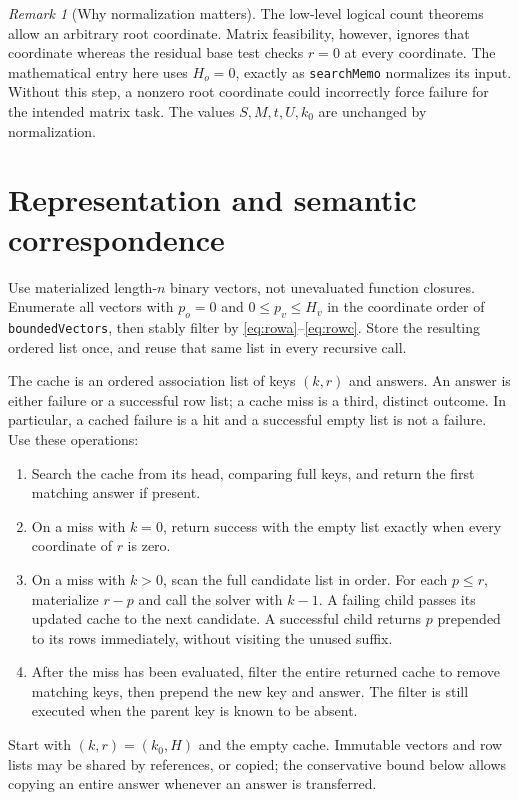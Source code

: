 \documentclass[11pt,a4paper]{article}
\theoremstyle{definition}
\theoremstyle{remark}
\newtheorem{remark}[theorem]{Remark}
\begin{document}
\begin{remark}[Why normalization matters]
The low-level logical count theorems allow an arbitrary root coordinate.
Matrix feasibility, however, ignores that coordinate whereas the residual
base test checks \(r=0\) at every coordinate. The mathematical entry here
uses \(H_o=0\), exactly as \texttt{searchMemo} normalizes its input. Without
this step, a nonzero root coordinate could incorrectly force failure for
the intended matrix task. The values \(S,M,t,U,k_0\) are unchanged by
normalization.
\end{remark}

\section{Representation and semantic correspondence}\label{sec:representation}
Use materialized length-\(n\) binary vectors, not unevaluated function
closures. Enumerate all vectors with \(p_o=0\) and \(0\le p_v\le H_v\)
in the coordinate order of \texttt{boundedVectors}, then stably filter by
\eqref{eq:rowa}--\eqref{eq:rowc}. Store the resulting ordered list once,
and reuse that same list in every recursive call.

The cache is an ordered association list of keys \((k,r)\) and answers.
An answer is either failure or a successful row list; a cache miss is a
third, distinct outcome. In particular, a cached failure is a hit and a
successful empty list is not a failure. Use these operations:
\begin{enumerate}
\item Search the cache from its head, comparing full keys, and return the
      first matching answer if present.
\item On a miss with \(k=0\), return success with the empty list exactly
      when every coordinate of \(r\) is zero.
\item On a miss with \(k>0\), scan the full candidate list in order.
      For each \(p\le r\), materialize \(r-p\) and call the solver with
      \(k-1\). A failing child passes its updated cache to the next
      candidate. A successful child returns \(p\) prepended to its rows
      immediately, without visiting the unused suffix.
\item After the miss has been evaluated, filter the entire returned cache
      to remove matching keys, then prepend the new key and answer.
      The filter is still executed when the parent key is known to be absent.
\end{enumerate}
Start with \((k,r)=(k_0,H)\) and the empty cache. Immutable vectors and
row lists may be shared by references, or copied; the conservative bound
below allows copying an entire answer whenever an answer is transferred.
\end{document}
